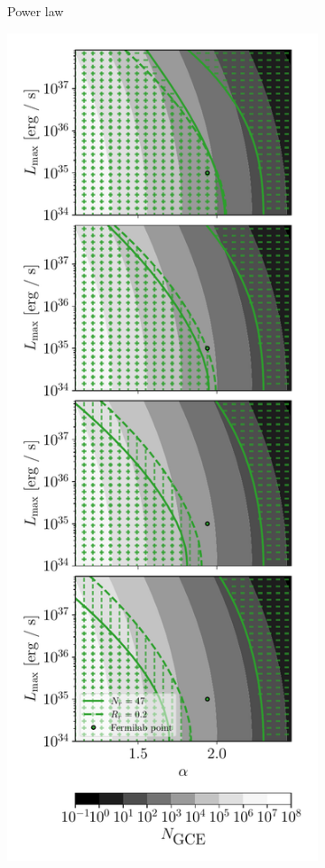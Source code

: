 \documentclass[a4paper,11pt]{article}
\begin{document}
\begin{figure}
\begin{subfigure}[h]{0.32\textwidth}
        \caption{Power law}
        \label{fig:sens-power-law}
    \end{subfigure}
    \hfill
    \begin{subfigure}[h]{0.32\textwidth}
        \includegraphics[width=\textwidth]{figs/power-law-alpha-sensitivity.pdf}

\end{subfigure}
\end{figure}
\end{document}

